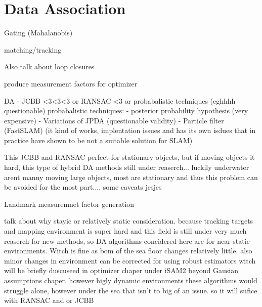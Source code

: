 \section{Data Association}


Gating (Mahalanobis)

matching/tracking

Also talk about loop closures

produce measurement factors for optimizer

DA - JCBB <3<3<3 or RANSAC <3 or probabalistic techniques (eghhhh questionable)
probabalistic techniques:
  - posterior probability hypothesis (very expensive) 
  - Variations of JPDA (questionable validity)
  - Particle filter (FastSLAM) (it kind of works, implentation issues and has its own isdues that in practice have shown to be not a suitable solution for SLAM)

This JCBB and RANSAC perfect for stationary objects, but if moving objects it hard, this type of hybrid DA methods still under reaserch... luckily underwater arent manny moving large objects, most are stationary and thus this problem can be avoided for the most part.... some caveats jesjes

Landmark measuremnet factor generation

talk about why stayic or relatively static consideration. because tracking targets and mapping environment is super hard and this field is still under very much reaserch for new methods, so DA algorithms concidered here are for near static environments. Witch is fine as bom of the sea floor changes relatively little. also minor changes in environment can be corrected for using robust estimators witch will be briefly duscuseed in optimizer chaper under iSAM2 beyond Gausian assumptions chaper. however higly dynamic environments these algorithms would struggle alone, however under the sea that isn't to big of an issue. so it will sufice with RANSAC and or JCBB